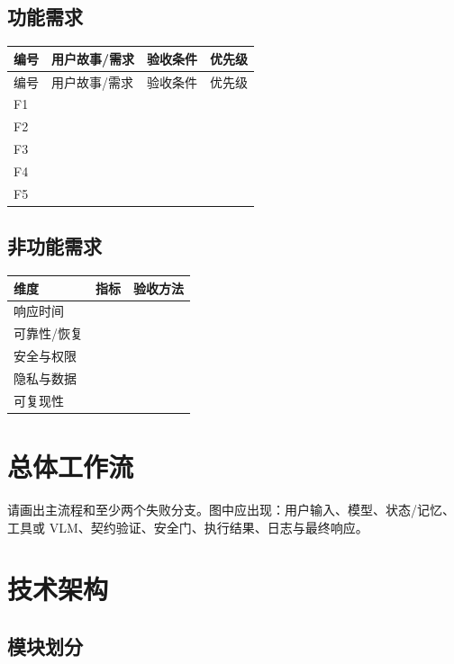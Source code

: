 \documentclass[UTF8,zihao=-4]{ctexart}
\begin{document}
\subsection{功能需求}

\begin{longtable}{C{1.2cm} L{4.0cm} L{7.0cm} L{2.0cm}}
\toprule
编号 & 用户故事/需求 & 验收条件 & 优先级\\
\midrule
\endfirsthead
\toprule
编号 & 用户故事/需求 & 验收条件 & 优先级\\
\midrule
\endhead
F1 & & &\\[1.2cm]
F2 & & &\\[1.2cm]
F3 & & &\\[1.2cm]
F4 & & &\\[1.2cm]
F5 & & &\\[1.2cm]
\bottomrule
\end{longtable}

\subsection{非功能需求}

\begin{tabularx}{\textwidth}{L{3.2cm} Y Y}
\toprule
维度 & 指标 & 验收方法\\
\midrule
响应时间 & &\\[1cm]
可靠性/恢复 & &\\[1cm]
安全与权限 & &\\[1cm]
隐私与数据 & &\\[1cm]
可复现性 & &\\[1cm]
\bottomrule
\end{tabularx}

\section{总体工作流}

请画出主流程和至少两个失败分支。图中应出现：用户输入、模型、状态/记忆、工具或 VLM、契约验证、安全门、执行结果、日志与最终响应。

\vspace{8cm}

\section{技术架构}

\subsection{模块划分}
\end{document}
